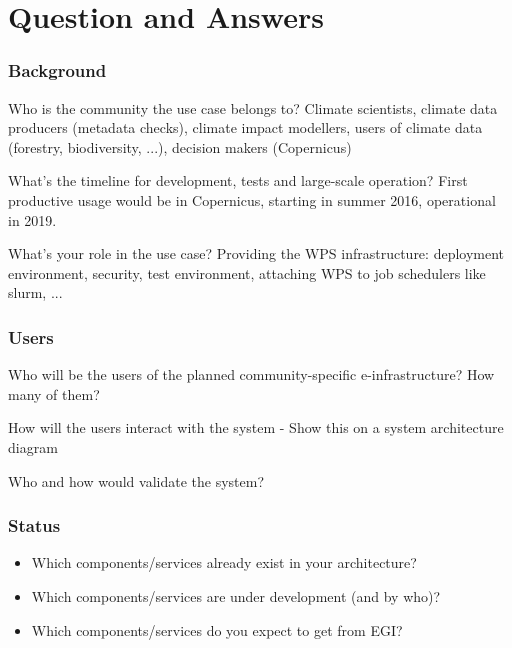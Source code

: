 \documentclass{beamer}
\begin{document}

  \section{Question and Answers}

  \begin{frame}
    \frametitle{Background}
    \begin{block}{Who is the community the use case belongs to?}
      Climate scientists, climate data producers (metadata checks), climate impact modellers, users of climate data (forestry, biodiversity, ...), decision makers (Copernicus) 
    \end{block}
    \begin{block}{What's the timeline for development, tests and large-scale operation?}
      First productive usage would be in Copernicus, starting in summer 2016, operational in 2019. 
    \end{block}
    \begin{block}{What's your role in the use case?}
      Providing the WPS infrastructure: deployment environment, security, test environment, attaching WPS to job schedulers like slurm, ... 
    \end{block}
  \end{frame}


   \begin{frame}
    \frametitle{Users}
    \begin{block}{Who will be the users of the planned community-specific e-infrastructure? How many of them?}
    \end{block}
    \begin{block}{How will the users interact with the system - Show this on a system architecture diagram}
    \end{block}
    \begin{block}{Who and how would validate the system?}
    \end{block}
  \end{frame}


   \begin{frame}
    \frametitle{Status}
    \begin{itemize}
      \item Which components/services already exist in your architecture?
      \item Which components/services are under development (and by who)?
      \item Which components/services do you expect to get from EGI? 
    \end{itemize}
  \end{frame}
\end{document}
